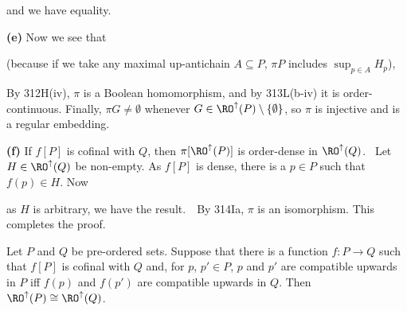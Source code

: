 {

\noindent and we have equality.\ \Qed

\medskip

{\bf (e)} Now we see that

\Centerline{$\pi\emptyset=\emptyset$,}


\noindent (because if we take any maximal up-antichain $A\subseteq P$,
$\pi P$ includes $\sup_{p\in A}H_p$),



\noindent By 312H(iv), $\pi$ is a Boolean homomorphism, and by
313L(b-iv) it is order-continuous.   Finally, $\pi G\ne\emptyset$
whenever $G\in\RO^{\uparrow}(P)\setminus\{\emptyset\}$, so $\pi$ is
injective and is a regular embedding.

\medskip

{\bf (f)} If $f[P]$ is cofinal with $Q$, then $\pi[\RO^{\uparrow}(P)]$
is order-dense in $\RO^{\uparrow}(Q)$.   \Prf\ Let
$H\in\RO^{\uparrow}(Q)$ be non-empty.   As $f[P]$ is dense, there is a
$p\in P$ such that $f(p)\in H$.   Now


\noindent as $H$ is arbitrary, we have the result.\ \QeD\   By 314Ia,
$\pi$ is an isomorphism.   This completes the proof.
}%

 Let $P$ and $Q$ be pre-ordered sets.
Suppose that there is a function $f:P\to Q$ such that $f[P]$ is cofinal
with $Q$ and, for $p$, $p'\in P$, $p$ and $p'$ are compatible upwards in
$P$ iff $f(p)$ and $f(p')$ are compatible upwards in $Q$.   Then
$\RO^{\uparrow}(P)\cong\RO^{\uparrow}(Q)$.



